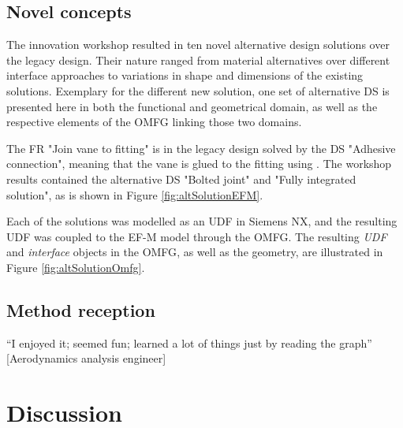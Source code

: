 \documentclass[fleqn,10pt]{olplainarticle}
\begin{document}

\subsection{Novel concepts}



The innovation workshop resulted in ten novel alternative design solutions over the legacy design.
Their nature ranged from material alternatives over different interface approaches to variations in shape and dimensions of the existing solutions.
Exemplary for the different new solution, one set of alternative DS is presented here in both the functional and geometrical domain, as well as the respective elements of the \ac{OMFG} linking those two domains.

The \ac{FR} "Join vane to fitting" is in the legacy design solved by the \ac{DS} "Adhesive connection", meaning that the vane is glued to the fitting using .
The workshop results contained the alternative DS "Bolted joint" and "Fully integrated solution", as is shown in Figure \ref{fig:altSolutionEFM}.

Each of the solutions was modelled as an \ac{UDF} in Siemens NX, and the resulting UDF was coupled to the EF-M model through the \ac{OMFG}.
The resulting \textit{UDF} and \textit{interface} objects in the \ac{OMFG}, as well as the geometry, are illustrated in Figure \ref{fig:altSolutionOmfg}.


\subsection{Method reception}

“I enjoyed it; seemed fun; learned a lot of things just by reading the graph” [Aerodynamics analysis engineer]


\section{Discussion}
\end{document}
